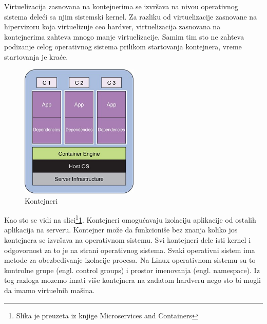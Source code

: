 \documentclass[12pt,oneside]{memoir}
\begin{document}
Virtuelizacija zasnovana na kontejnerima se izvršava na nivou operativnog sistema deleći sa njim sistemski kernel. Za razliku od virtuelizacije zasnovane na hipervizoru koja virtuelizuje ceo hardver, virtuelizacija zasnovana na kontejnerima zahteva mnogo manje virtuelizacije. Samim tim sto ne zahteva podizanje celog operativnog sistema prilikom startovanja kontejnera, vreme startovanja je kraće\cite{gswc}. 
 
\begin{figure}[!ht]
  \centering
  \includegraphics[width=0.5\textwidth]{Slika 4.jpg}
  \caption{Kontejneri}
  \label{fig:kontejneri}
\end{figure}
 
Kao sto se vidi na slici\footnote{Slika je preuzeta iz knjige Microservices and Containers}\ref{fig:kontejneri}. Kontejneri omogućavaju izolaciju aplikacije od ostalih aplikacija na serveru. Kontejner može da funkcioniše bez znanja koliko jos kontejnera se izvršava na operativnom sistemu. Svi kontejneri dele isti kernel i odgovornost za to je na strani operativnog sistema. Svaki operativni sistem ima metode za obezbeđivanje izolacije procesa. Na Linux operativnom sistemu su to kontrolne grupe (engl. control groups) i prostor imenovanja (engl. namespace). Iz tog razloga mozemo imati više kontejnera na zadatom hardveru nego sto bi mogli da imamo virtuelnih mašina\cite{mac}. 
\end{document}
